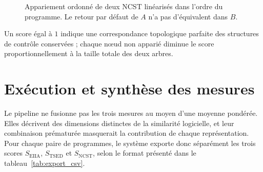 {\begin{figure}[H]
{%
}
\caption{Appariement ordonné de deux NCST linéarisés dans l'ordre du
programme. Le retour par défaut de $A$ n'a pas d'équivalent dans $B$.}
\label{fig:ncst_matching}
\end{figure}

Un score égal à $1$ indique une correspondance topologique parfaite des
structures de contrôle conservées ; chaque nœud non apparié diminue le score
proportionnellement à la taille totale des deux arbres.

\section{Exécution et synthèse des mesures}

Le pipeline ne fusionne pas les trois mesures au moyen d'une moyenne
pondérée. Elles décrivent des dimensions distinctes de la similarité
logicielle, et leur combinaison prématurée masquerait la contribution de
chaque représentation. Pour chaque paire de programmes, le système exporte
donc séparément les trois scores $S_{\mathrm{EIIA}}$, $S_{\mathrm{TSED}}$ et
$S_{\mathrm{NCST}}$, selon le format présenté dans le
tableau~\ref{tab:export_csv}.

}
